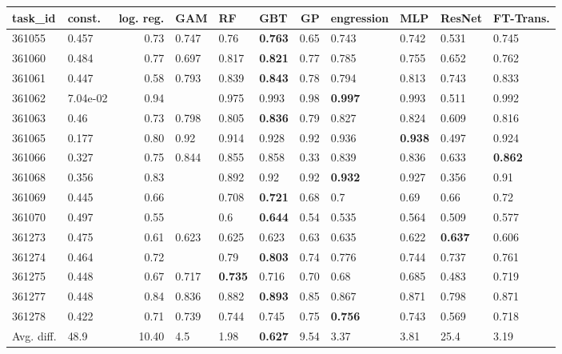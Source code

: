 \begin{table}[ht!]
\centering
\begingroup\footnotesize
\begin{tabular}{llrlllrllll}
  \hline
\hline
task\_id & const. & log. reg. & GAM & RF & GBT & GP & engression & MLP & ResNet & FT-Trans. \\ 
  \hline
361055 & 0.457 & 0.73 & 0.747 & 0.76 & \textbf{0.763} & 0.65 & 0.743 & 0.742 & 0.531 & 0.745 \\ 
  361060 & 0.484 & 0.77 & 0.697 & 0.817 & \textbf{0.821} & 0.77 & 0.785 & 0.755 & 0.652 & 0.762 \\ 
  361061 & 0.447 & 0.58 & 0.793 & 0.839 & \textbf{0.843} & 0.78 & 0.794 & 0.813 & 0.743 & 0.833 \\ 
  361062 & 7.04e-02 & 0.94 &  & 0.975 & 0.993 & 0.98 & \textbf{0.997} & 0.993 & 0.511 & 0.992 \\ 
  361063 & 0.46 & 0.73 & 0.798 & 0.805 & \textbf{0.836} & 0.79 & 0.827 & 0.824 & 0.609 & 0.816 \\ 
  361065 & 0.177 & 0.80 & 0.92 & 0.914 & 0.928 & 0.92 & 0.936 & \textbf{0.938} & 0.497 & 0.924 \\ 
  361066 & 0.327 & 0.75 & 0.844 & 0.855 & 0.858 & 0.33 & 0.839 & 0.836 & 0.633 & \textbf{0.862} \\ 
  361068 & 0.356 & 0.83 &  & 0.892 & 0.92 & 0.92 & \textbf{0.932} & 0.927 & 0.356 & 0.91 \\ 
  361069 & 0.445 & 0.66 &  & 0.708 & \textbf{0.721} & 0.68 & 0.7 & 0.69 & 0.66 & 0.72 \\ 
  361070 & 0.497 & 0.55 &  & 0.6 & \textbf{0.644} & 0.54 & 0.535 & 0.564 & 0.509 & 0.577 \\ 
  361273 & 0.475 & 0.61 & 0.623 & 0.625 & 0.623 & 0.63 & 0.635 & 0.622 & \textbf{0.637} & 0.606 \\ 
  361274 & 0.464 & 0.72 &  & 0.79 & \textbf{0.803} & 0.74 & 0.776 & 0.744 & 0.737 & 0.761 \\ 
  361275 & 0.448 & 0.67 & 0.717 & \textbf{0.735} & 0.716 & 0.70 & 0.68 & 0.685 & 0.483 & 0.719 \\ 
  361277 & 0.448 & 0.84 & 0.836 & 0.882 & \textbf{0.893} & 0.85 & 0.867 & 0.871 & 0.798 & 0.871 \\ 
  361278 & 0.422 & 0.71 & 0.739 & 0.744 & 0.745 & 0.75 & \textbf{0.756} & 0.743 & 0.569 & 0.718 \\ 
   \hline
Avg. diff. & 48.9 & 10.40 & 4.5 & 1.98 & \textbf{0.627} & 9.54 & 3.37 & 3.81 & 25.4 & 3.19 \\ 

\end{tabular}
\end{table}
